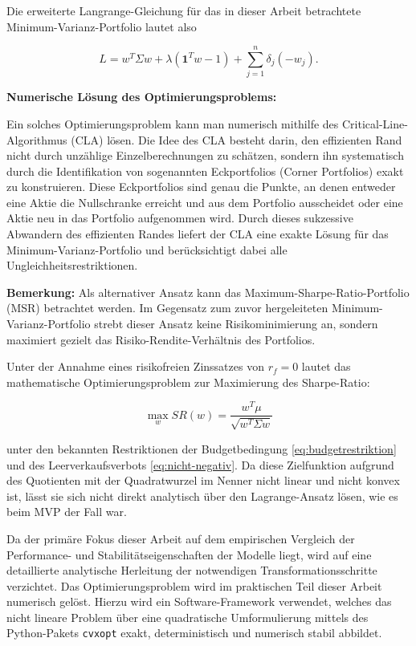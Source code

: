 \documentclass[parskip=half]{scrartcl}
\begin{document}
	Die erweiterte Langrange-Gleichung für das in dieser Arbeit betrachtete Minimum-Varianz-Portfolio lautet also
	
	\begin{equation}
		L = w^T \Sigma w + \lambda (\mathbf{1}^Tw - 1) + \sum_{j=1}^{n} \delta_j  (-w_j) . \label{eq:kkt_mvp}
	\end{equation}
	
	\textbf{Numerische Lösung des Optimierungsproblems: }
	
	Ein solches Optimierungsproblem kann man numerisch mithilfe des Critical-Line-Algorithmus (CLA) lösen. Die Idee des CLA besteht darin, den effizienten Rand nicht durch unzählige Einzelberechnungen zu schätzen, sondern ihn systematisch durch die Identifikation von sogenannten Eckportfolios (Corner Portfolios) exakt zu konstruieren. Diese Eckportfolios sind genau die Punkte, an denen entweder eine Aktie die Nullschranke erreicht und aus dem Portfolio ausscheidet oder eine Aktie neu in das Portfolio aufgenommen wird. Durch dieses sukzessive Abwandern des effizienten Randes liefert der CLA eine exakte Lösung für das Minimum-Varianz-Portfolio und berücksichtigt dabei alle Ungleichheitsrestriktionen.
	
	\textbf{Bemerkung:}
	Als alternativer Ansatz kann das Maximum-Sharpe-Ratio-Portfolio (MSR) betrachtet werden. Im Gegensatz zum zuvor hergeleiteten Minimum-Varianz-Portfolio strebt dieser Ansatz keine Risikominimierung an, sondern maximiert gezielt das Risiko-Rendite-Verhältnis des Portfolios.
	
	Unter der Annahme eines risikofreien Zinssatzes von $r_f = 0$ lautet das mathematische Optimierungsproblem zur Maximierung des Sharpe-Ratio:
	
	\begin{equation}
		\max_{w} SR(w) = \frac{w^T \mu}{\sqrt{w^T \Sigma w}}
	\end{equation}
	
	unter den bekannten Restriktionen der Budgetbedingung \eqref{eq:budgetrestriktion} und des Leerverkaufsverbots \eqref{eq:nicht-negativ}. Da diese Zielfunktion aufgrund des Quotienten mit der Quadratwurzel im Nenner nicht linear und nicht konvex ist, lässt sie sich nicht direkt analytisch über den Lagrange-Ansatz lösen, wie es beim MVP der Fall war.
	
	Da der primäre Fokus dieser Arbeit auf dem empirischen Vergleich der Performance- und Stabilitätseigenschaften der Modelle liegt, wird auf eine detaillierte analytische Herleitung der notwendigen Transformationsschritte verzichtet. Das Optimierungsproblem wird im praktischen Teil dieser Arbeit numerisch gelöst. Hierzu wird ein Software-Framework verwendet, welches das nicht lineare Problem über eine quadratische Umformulierung mittels des Python-Pakets \texttt{cvxopt} exakt, deterministisch und numerisch stabil abbildet.
	
\end{document}
